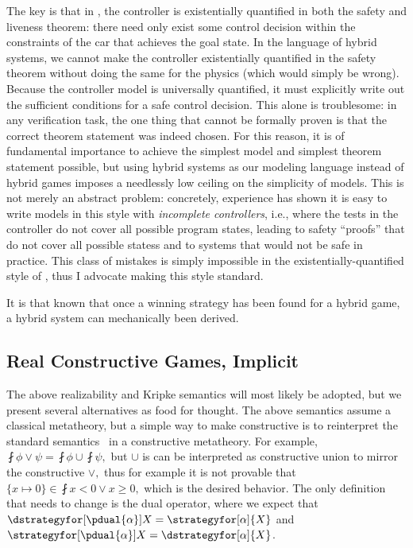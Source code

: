 The key is that in , the controller is existentially quantified in both the safety and liveness theorem: there need only exist some control decision within the constraints of the car that achieves the goal state.
In the language of hybrid systems, we cannot make the controller existentially quantified in the safety theorem without doing the same for the physics (which would simply be wrong).
Because the controller model is universally quantified, it must explicitly write out the sufficient conditions for a safe control decision.
This alone is troublesome: in any verification task, the one thing that cannot be formally proven is that the correct theorem statement was indeed chosen.
For this reason, it is of fundamental importance to achieve the simplest model and simplest theorem statement possible, but using hybrid systems as our modeling language instead of hybrid games imposes a needlessly low ceiling on the simplicity of models.
This is not merely an abstract problem: concretely, experience has shown it is easy to write models in this style with \emph{incomplete controllers}, i.e., where the tests in the controller do not cover all possible program states, leading to safety ``proofs'' that do not cover all possible statess and to systems that would not be safe in practice.
This class of mistakes is simply impossible in the existentially-quantified style of , thus I advocate making this style standard.


It is that known that once a winning strategy has been found for a hybrid game, a hybrid system can mechanically been derived.


\subsection{Real Constructive Games, Implicit}
The above realizability and Kripke semantics will most likely be adopted, but we present several alternatives as food for thought.
The above semantics assume a classical metatheory, but a simple way to make \dGL constructive is to reinterpret the standard \dGL semantics~\cite{DBLP:journals/tocl/Platzer17} in a constructive metatheory.
For example, $\fint{\phi \lor \psi}{} = \fint{\phi}{} \cup \fint{\psi}{},$ but $\cup$ is can be interpreted as constructive union to mirror the constructive $\lor,$ thus for example it is not provable that $\{x \mapsto 0\} \in \fint{x < 0 \lor x \geq 0},$ which is the desired behavior.
The only definition that needs to change is the dual operator, where we expect that $\dstrategyfor[\pdual{\alpha}]{X} = \strategyfor[\alpha]{X}$ and $\strategyfor[\pdual{\alpha}]{X} = \dstrategyfor[\alpha]{X}$.

